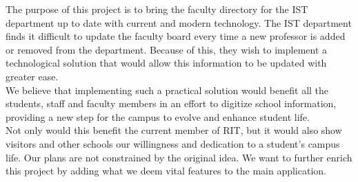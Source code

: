 The purpose of this project is to bring the faculty directory for the IST department up to date with current and modern technology. The IST department finds it difficult to update the faculty board every time a new professor is added or removed from the department. Because of this, they wish to implement a technological solution that would allow this information to be updated with greater ease.\\

We believe that implementing such a practical solution would benefit all the students, staff and faculty members in an effort to digitize school information, providing a new step for the campus to evolve and enhance student life.\\

Not only would this benefit the current member of RIT, but it would also show visitors and other schools our willingness and dedication to a student's campus life. Our plans are not constrained by the original idea. We want to further enrich this project by adding what we deem vital features to the main application.